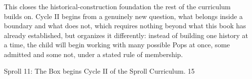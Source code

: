 \documentclass[12pt]{book}
\newcommand{\pagenum}[1]{\vfill{\color{gray!50}\footnotesize #1}}
\begin{document}
\vspace{0.15in}
This closes the historical-construction foundation the rest of the curriculum builds on. Cycle II begins from a genuinely new question, what belongs inside a boundary and what does not, which requires nothing beyond what this book has already established, but organizes it differently: instead of building one history at a time, the child will begin working with many possible Pops at once, some admitted and some not, under a stated rule of membership.

\vspace{0.3in}
{\small Sproll 11: The Box begins Cycle II of the Sproll Curriculum.}
\pagenum{15}
\end{document}
